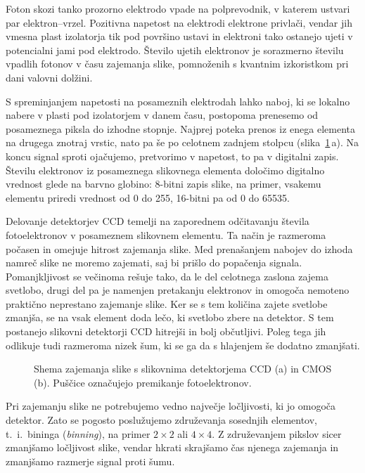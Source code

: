 Foton skozi tanko prozorno elektrodo vpade na polprevodnik, v katerem ustvari
par elektron--vrzel. Pozitivna napetost na elektrodi elektrone privlači, vendar jih 
vmesna plast izolatorja tik pod površino ustavi in elektroni tako ostanejo ujeti v potencialni jami
pod elektrodo. Število ujetih elektronov je sorazmerno številu vpadlih fotonov v času zajemanja slike, 
pomnoženih s kvantnim izkoristkom pri dani valovni dolžini. 

S spreminjanjem napetosti na posameznih elektrodah lahko naboj, ki se lokalno nabere 
v plasti pod izolatorjem v danem času, postopoma prenesemo od posameznega 
piksla do izhodne stopnje. Najprej poteka prenos iz enega elementa na drugega znotraj vrstic, 
nato pa še po celotnem zadnjem stolpcu (slika~\ref{11_CCD}\,a). Na koncu signal sproti ojačujemo, 
pretvorimo v napetost, to pa v digitalni zapis. Številu elektronov iz posameznega
slikovnega elementa določimo digitalno vrednost glede na barvno globino: 8-bitni zapis slike, 
na primer, vsakemu elementu priredi vrednost od 0 do 255, 16-bitni pa od 0 do 65535.

Delovanje detektorjev CCD temelji na zaporednem odčitavanju števila fotoelektronov v posameznem 
slikovnem elementu. Ta način je razmeroma počasen in omejuje hitrost zajemanja slike. Med 
prenašanjem nabojev do izhoda namreč slike ne moremo zajemati, saj bi prišlo do popačenja signala. 
Pomanjkljivost se večinoma rešuje tako, da le del celotnega zaslona zajema svetlobo, drugi del
pa je namenjen pretakanju elektronov in omogoča nemoteno praktično neprestano zajemanje slike.
Ker se s tem količina zajete svetlobe zmanjša, se na vsak element doda lečo, ki svetlobo zbere
na detektor. S tem postanejo slikovni detektorji CCD hitrejši in bolj občutljivi. Poleg
tega jih odlikuje tudi razmeroma nizek šum, ki se ga da s hlajenjem še dodatno 
zmanjšati. 

\begin{figure}[h]
\centering
\def\svgwidth{100truemm} 

\caption{Shema zajemanja slike s slikovnima detektorjema CCD (a) in  CMOS (b). Puščice označujejo premikanje
fotoelektronov.}
\label{11_CCD}
\end{figure}

\begin{remark}
Pri zajemanju slike ne potrebujemo vedno največje ločljivosti, ki jo omogoča detektor. 
Zato se pogosto poslužujemo združevanja sosednjih elementov, t.\ i.\ bininga ({\it binning}), 
na primer $2\times2$ ali $4\times4$. Z združevanjem pikslov sicer zmanjšamo ločljivost slike, 
vendar hkrati skrajšamo čas njenega zajemanja in zmanjšamo razmerje signal proti šumu. 
\end{remark}

